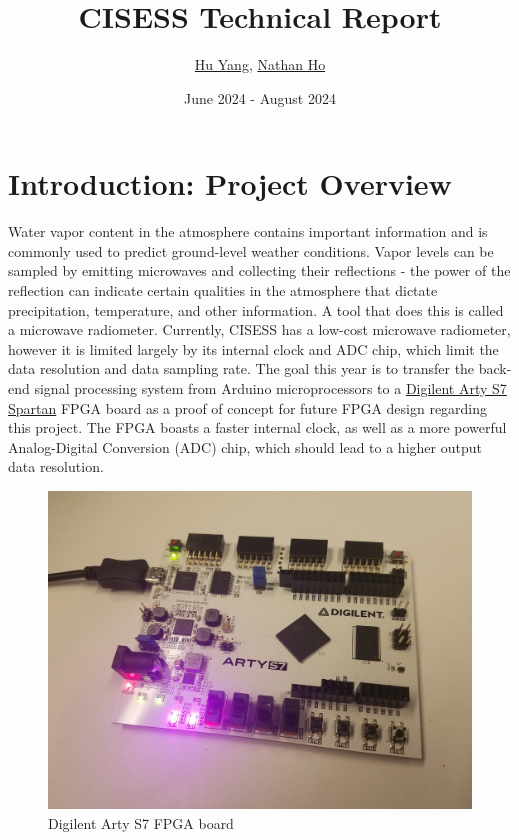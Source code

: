 \documentclass[titlepage]{article}
\title{\huge CISESS Technical Report}
\author{
\href{mailto:huyang@umd.edu}{Hu Yang},
\href{mailto:nho08@umd.edu}{Nathan Ho}
}
\date{June 2024 - August 2024}
\begin{document}
\begin{titlepage}    
    \maketitle
\end{titlepage}


\section{Introduction: Project Overview}
\label{introduction}

Water vapor content in the atmosphere contains important information and is commonly used to predict ground-level weather conditions. Vapor levels can be sampled by emitting microwaves and collecting their reflections - the power of the reflection can indicate certain qualities in the atmosphere that dictate precipitation, temperature, and other information. A tool that does this is called a microwave radiometer. Currently, CISESS has a low-cost microwave radiometer, however it is limited largely by its internal clock and ADC chip, which limit the data resolution and data sampling rate. The goal this year is to transfer the back-end signal processing system from Arduino microprocessors to a \href{https://digilent.com/reference/programmable-logic/arty-s7/start}{Digilent Arty S7 Spartan} FPGA board as a proof of concept for future FPGA design regarding this project. The FPGA boasts a faster internal clock, as well as a more powerful Analog-Digital Conversion (ADC) chip, which should lead to a higher output data resolution.

\begin{figure}[h]
    \includegraphics[width=\textwidth]{assets/arty.jpg}
    \centering
    \caption{Digilent Arty S7 FPGA board}
\end{figure}
\label{figure1}
\end{document}
